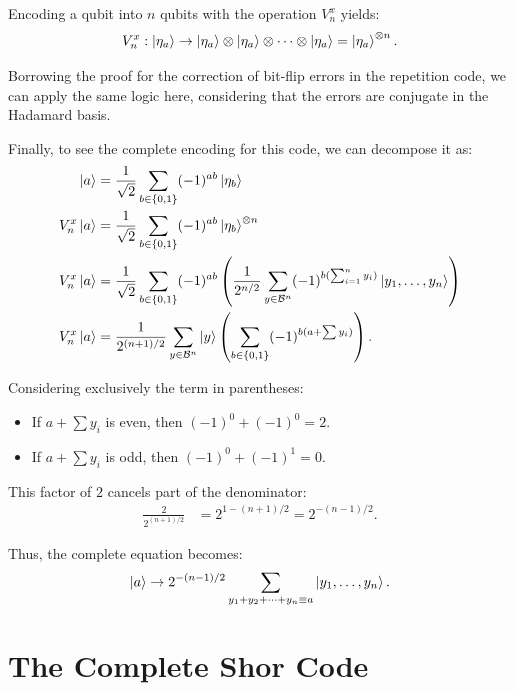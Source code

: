 Encoding a qubit into $n$ qubits with the operation $V_n^x$ yields:
\begin{equation}
  V_n^x : \ket{\eta_a} \to \ket{\eta_a} \otimes \ket{\eta_a} \otimes \dots \otimes \ket{\eta_a} = \ket{\eta_a}^{\otimes n}
  \label{eq:hadamard_encode_n}
.\end{equation}

Borrowing the proof for the correction of bit-flip errors in the repetition code, we can apply the same logic here, considering that the errors are conjugate in the Hadamard basis.

Finally, to see the complete encoding for this code, we can decompose it as:
\begin{align*}
  \ket{a} &= \frac{1}{\sqrt{2}}\sum_{b \in \left\{0, 1\right\}} (-1)^{ab}\ket{\eta_b}\\
  V_n^x \ket{a} &= \frac{1}{\sqrt{2}} \sum_{b \in \left\{0, 1\right\}} (-1)^{ab} \ket{\eta_b}^{\otimes n}\\
  V_n^x \ket{a} &= \frac{1}{\sqrt{2}}\sum_{b \in \left\{0, 1\right\}} (-1)^{ab} \left( \frac{1}{2^{n/2}} \sum_{y\in \mathcal{B}^n} (-1)^{b (\sum_{i = 1}^n y_i)} \ket{y_1, \dots, y_n}\right)\\
  V_n^x \ket{a} &= \frac{1}{2^{(n + 1) / 2}}\sum_{y \in \mathcal{B}^n} \ket{y} \left(\sum_{b \in \left\{0, 1\right\}} (-1)^{b(a + \sum y_i)}\right)
.\end{align*}

Considering exclusively the term in parentheses:
\begin{itemize}
  \item If $a + \sum y_i$ is even, then $(-1)^0 + (-1)^0 = 2$.
  \item If $a + \sum y_i$ is odd, then $(-1)^0 + (-1)^1 = 0$.
\end{itemize}

This factor of $2$ cancels part of the denominator:
\begin{align*}
  \frac{2}{2^{(n + 1)/2}} &= 2^{1 - (n + 1)/2} = 2^{-(n - 1)/2}
.\end{align*}

Thus, the complete equation becomes:
\begin{equation}
  \ket{a} \to 2^{-(n - 1)/2} \sum_{y_1 + y_2 + \dots + y_n \equiv a}\ket{y_1, \dots, y_n}
  \label{eq:complete_hadamard}
.\end{equation}
\citep{Cesar2024}

\section{The Complete Shor Code}

